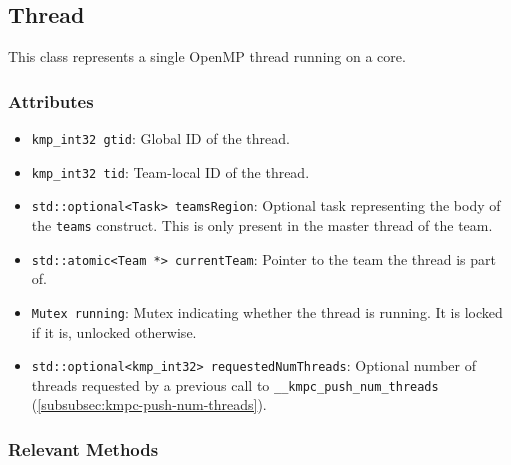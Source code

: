 \subsection{Thread}

This class represents a single OpenMP thread running on a core.

\subsubsection{Attributes}

\begin{itemize}
	\item \texttt{kmp_int32 gtid}: Global ID of the thread.
	\item \texttt{kmp_int32 tid}: Team-local ID of the thread.
	\item \texttt{std::optional<Task> teamsRegion}: Optional task representing the body of the
	      \texttt{teams} construct. This is only present in the master thread of the team.
	\item \texttt{std::atomic<Team *> currentTeam}: Pointer to the team the thread is part of.
	\item \texttt{Mutex running}: Mutex indicating whether the thread is running. It is locked if it
	      is, unlocked otherwise. 
	\item \texttt{std::optional<kmp_int32> requestedNumThreads}: Optional number of threads requested
	      by a previous call to \texttt{__kmpc_push_num_threads} (\cref{subsubsec:kmpc-push-num-threads}).
\end{itemize}

\subsubsection{Relevant Methods}

